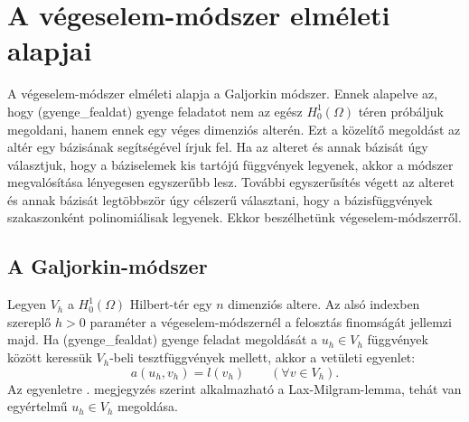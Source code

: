 \section{A végeselem-módszer elméleti alapjai}\label{sec:fem}

A végeselem-módszer elméleti alapja a Galjorkin módszer. Ennek alapelve az, hogy \aref({gyenge_fealdat}) gyenge feladatot nem az egész $H_0^1(\Omega)$ téren próbáljuk megoldani, hanem ennek egy véges dimenziós  alterén. Ezt a közelítő megoldást az altér egy bázisának segítségével írjuk fel. Ha az alteret és annak bázisát úgy választjuk, hogy a báziselemek kis tartójú függvények legyenek, akkor a módszer megvalósítása lényegesen egyszerűbb lesz. További egyszerűsítés végett az alteret és annak bázisát legtöbbször úgy célszerű választani, hogy a bázisfüggvények szakaszonként polinomiálisak legyenek. Ekkor beszélhetünk végeselem-módszerről.

\subsection{A Galjorkin-módszer}


Legyen $V_h$ a $H_0^1(\Omega)$ Hilbert-tér egy $n$ dimenziós altere. Az alsó indexben szereplő $h>0$ paraméter a végeselem-módszernél a felosztás finomságát jellemzi majd. Ha \aref({gyenge_fealdat}) gyenge feladat megoldását a $u_h \in V_h$ függvények között keressük $V_h$-beli tesztfüggvények mellett, akkor a vetületi egyenlet:
\begin{equation}\label{vetuleti}
		a(u_h,v_h) = l(v_h) \qquad (\forall v \in V_h).
\end{equation}
Az egyenletre . megjegyzés szerint alkalmazható a Lax-Milgram-lemma, tehát van egyértelmű $u_h \in V_h$ megoldása. 

